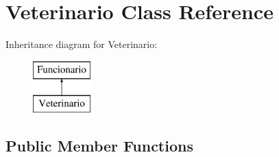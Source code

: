 \hypertarget{class_veterinario}{}\section{Veterinario Class Reference}
\label{class_veterinario}
Inheritance diagram for Veterinario\+:\begin{figure}[H]
\begin{center}
\leavevmode
\includegraphics[height=2.000000cm]{class_veterinario}
\end{center}
\end{figure}
\subsection*{Public Member Functions}
